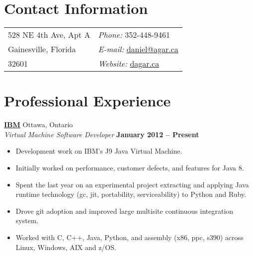 \documentclass[margin,line]{res}
\begin{document}

\begin{resume}


  \section{\sc Contact Information}

    \vspace{.05in}

    \begin{tabular}{@{}p{3.5in}p{4in}}
      528 NE 4th Ave, Apt A                  & {\it Phone:}  352-448-9461 \\                     
      Gainesville, Florida         & {\it E-mail:}  \href{mailto:daniel@agar.ca}{daniel@agar.ca}\\       
      32601                          & {\it Website:} \href{http://dagar.ca}{dagar.ca} \\     
    \end{tabular}
    
    

  \section{\sc Professional Experience}
  
        \href{http://www.ibm.com/ca/en/}{\bf IBM} {\hfill Ottawa, Ontario}\\
      {\em Virtual Machine Software Developer} \hfill {\bf January 2012 -- Present}
      \begin{itemize} \itemsep -2pt
        \item Development work on IBM's J9 Java Virtual Machine.
        \item Initially worked on performance, customer defects, and features for Java 8.
	\item Spent the last year on an experimental project extracting and applying Java runtime technology (gc, jit, portability, serviceability) to Python and Ruby.
        \item Drove git adoption and improved large multisite continuous integration system.
        \item Worked with C, C++, Java, Python, and assembly (x86, ppc, s390) across Linux, Windows, AIX and z/OS.

      \end{itemize}  


\end{resume}
\end{document}
